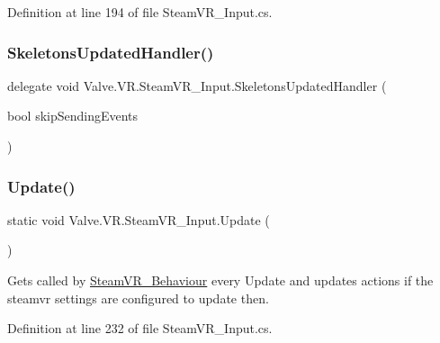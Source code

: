 Definition at line 194 of file Steam\+V\+R\+\_\+\+Input.\+cs.

\mbox{\label{class_valve_1_1_v_r_1_1_steam_v_r___input_a1880748ba2acc071a2a1e6eaa2ca2fd5}} 
\subsubsection{\texorpdfstring{SkeletonsUpdatedHandler()}{SkeletonsUpdatedHandler()}}
{\footnotesize\ttfamily delegate void Valve.\+V\+R.\+Steam\+V\+R\+\_\+\+Input.\+Skeletons\+Updated\+Handler (\begin{DoxyParamCaption}\item[{bool}]{skip\+Sending\+Events }\end{DoxyParamCaption})}

\mbox{\label{class_valve_1_1_v_r_1_1_steam_v_r___input_a44aeadc921fc991c03d70db06fbfad0a}} 
\subsubsection{\texorpdfstring{Update()}{Update()}}
{\footnotesize\ttfamily static void Valve.\+V\+R.\+Steam\+V\+R\+\_\+\+Input.\+Update (\begin{DoxyParamCaption}{ }\end{DoxyParamCaption})\hspace{0.3cm}{\ttfamily [static]}}



Gets called by \mbox{\hyperlink{class_valve_1_1_v_r_1_1_steam_v_r___behaviour}{Steam\+V\+R\+\_\+\+Behaviour}} every Update and updates actions if the steamvr settings are configured to update then. 



Definition at line 232 of file Steam\+V\+R\+\_\+\+Input.\+cs.

\mbox{\label{class_valve_1_1_v_r_1_1_steam_v_r___input_ab9f7ee5abcd2dd6a91125f5759e728a9}} 

